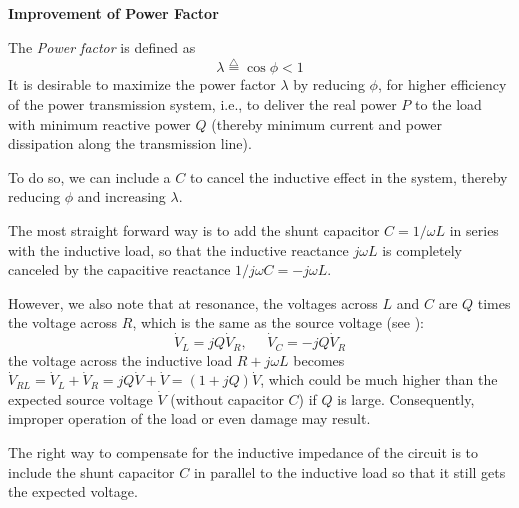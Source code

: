 \documentclass{article}
\begin{document}
{\bf Improvement of Power Factor}

The {\em Power factor} is defined as
\begin{equation}
  \lambda\stackrel{\triangle}{=}\cos \phi < 1
\end{equation}
It is desirable to maximize the power factor $\lambda$ by reducing $\phi$,
for higher efficiency of the power transmission system, i.e., to deliver 
the real power $P$ to the load with minimum reactive power $Q$ (thereby 
minimum current and power dissipation along the transmission line).

To do so, we can include a 
$C$ to cancel the inductive effect in the system, thereby reducing $\phi$ 
and increasing $\lambda$. 

The most straight forward way is to add the shunt capacitor 
$C=1/\omega L$ in series with the inductive load, so that the 
inductive reactance $j\omega L$ is completely canceled by the 
capacitive reactance $1/j\omega C=-j\omega L$.


However, we also note that at resonance, the voltages across $L$ and 
$C$ are $Q$ times the voltage across $R$, which is the same as the 
source voltage (see ):
\begin{equation}
  \dot{V}_L=jQ\dot{V}_R,\;\;\;\;\;\dot{V}_C=-jQ\dot{V}_R
\end{equation}
the voltage across the inductive load $R+j\omega L$ becomes 
$\dot{V}_{RL}=\dot{V}_L+\dot{V}_R=jQ\dot{V}+\dot{V}=(1+jQ)\dot{V}$, 
which could be much higher than the expected source voltage $\dot{V}$ 
(without capacitor $C$) if $Q$ is large. Consequently, improper 
operation of the load or even damage may result.

The right way to compensate for the inductive impedance of the circuit
is to include the shunt capacitor $C$ in parallel to the inductive load 
so that it still gets the expected voltage.

\end{document}
